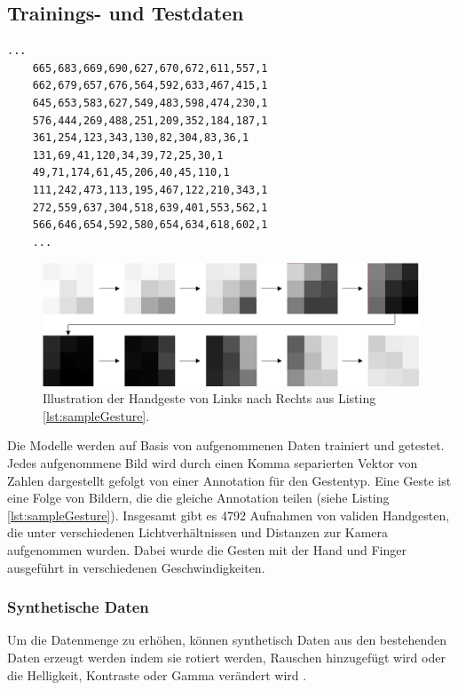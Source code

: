 \subsection{Trainings- und Testdaten}
\begin{lstlisting}[label=lst:sampleGesture,caption={Beispiel einer gespeicherten Handgeste von Links nach Rechts.}]
    ...
    665,683,669,690,627,670,672,611,557,1
    662,679,657,676,564,592,633,467,415,1
    645,653,583,627,549,483,598,474,230,1
    576,444,269,488,251,209,352,184,187,1
    361,254,123,343,130,82,304,83,36,1
    131,69,41,120,34,39,72,25,30,1
    49,71,174,61,45,206,40,45,110,1
    111,242,473,113,195,467,122,210,343,1
    272,559,637,304,518,639,401,553,562,1
    566,646,654,592,580,654,634,618,602,1
    ...
\end{lstlisting}
\begin{figure}
    \centering
    \includegraphics[width=\linewidth]{images/sample_gesture_total.jpg}
    \caption{Illustration der Handgeste von Links nach Rechts aus Listing \ref{lst:sampleGesture}.}
    \label{fig:sample_gesture}
\end{figure}
Die Modelle werden auf Basis von aufgenommenen Daten trainiert und getestet. Jedes aufgenommene Bild wird durch einen Komma separierten Vektor von Zahlen dargestellt gefolgt von einer Annotation für den Gestentyp.
Eine Geste ist eine Folge von Bildern, die die gleiche Annotation teilen (siehe Listing \ref{lst:sampleGesture}). Insgesamt gibt es 4792 Aufnahmen von validen Handgesten, die unter verschiedenen Lichtverhältnissen
und Distanzen zur Kamera aufgenommen wurden. Dabei wurde die Gesten mit der Hand und Finger ausgeführt in verschiedenen Geschwindigkeiten.
\subsubsection{Synthetische Daten}
\label{sec:synthetischeDaten}
Um die Datenmenge zu erhöhen, können synthetisch Daten aus den bestehenden Daten erzeugt werden indem sie rotiert werden, Rauschen hinzugefügt wird oder die Helligkeit, Kontraste oder
Gamma verändert wird \cite{venzkeArticle}.
